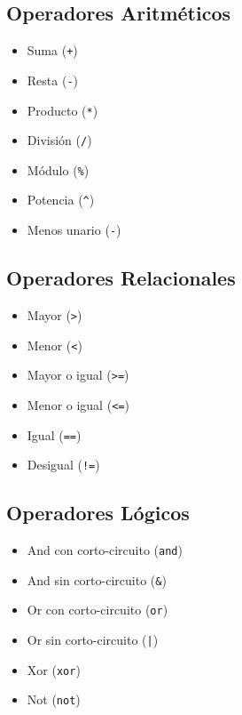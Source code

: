 \documentclass[12pt, spanish]{report}
\begin{document}
\subsection{Operadores Aritm\'eticos}
\begin{itemize}
\item Suma (\texttt{+})
\item Resta    (\texttt{-})
\item Producto (\texttt{*})
\item Divisi\'on  (\texttt{/})
\item M\'odulo (\texttt{\%})
\item Potencia (\texttt{\^})
\item Menos unario (\texttt{-})
\end{itemize}

\subsection{Operadores Relacionales}
\begin{itemize}
\item Mayor         (\texttt{>})
\item Menor         (\texttt{<})
\item Mayor o igual (\texttt{>=})
\item Menor o igual (\texttt{<=})
\item Igual (\texttt{==})
\item Desigual      (\texttt{!=})
\end{itemize}

\subsection{Operadores L\'ogicos}
\begin{itemize}
\item And con corto-circuito (\texttt{and})
\item And sin corto-circuito (\texttt{\&})
\item Or con corto-circuito  (\texttt{or})
\item Or sin corto-circuito  (\texttt{|})
\item Xor (\texttt{xor})
\item Not (\texttt{not})
\end{itemize}
\end{document}
